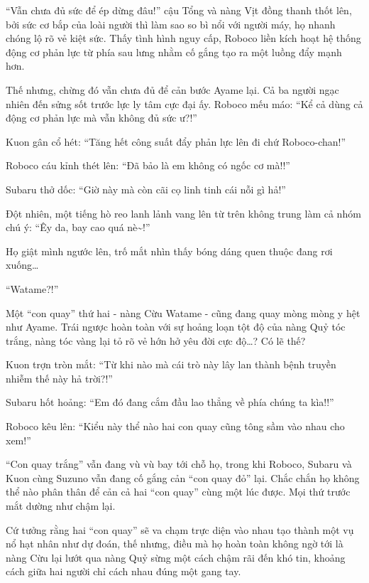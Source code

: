 \documentclass[../main.tex]{subfiles}
\begin{document}
``Vẫn chưa đủ sức để ép dừng đâu!'' cậu Tổng và nàng Vịt đồng thanh thốt lên, bởi sức cơ bắp của loài người thì làm sao so bì nổi với người máy, họ nhanh chóng lộ rõ vẻ kiệt sức. Thấy tình hình nguy cấp, Roboco liền kích hoạt hệ thống động cơ phản lực từ phía sau lưng nhằm cố gắng tạo ra một luồng đẩy mạnh hơn.

Thế nhưng, chừng đó vẫn chưa đủ để cản bước Ayame lại. Cả ba người ngạc nhiên đến sửng sốt trước lực ly tâm cực đại ấy. Roboco mếu máo: ``Kể cả dùng cả động cơ phản lực mà vẫn không đủ sức ư?!''

Kuon gân cổ hét: ``Tăng hết công suất đẩy phản lực lên đi chứ Roboco-chan!''

Roboco cáu kỉnh thét lên: ``Đã bảo là em không có ngốc cơ mà!!''

Subaru thở dốc: ``Giờ này mà còn cãi cọ linh tinh cái nỗi gì hả!''

Đột nhiên, một tiếng hò reo lanh lảnh vang lên từ trên không trung làm cả nhóm chú ý: ``Êy da, bay cao quá nè\~{}!''

Họ giật mình ngước lên, trố mắt nhìn thấy bóng dáng quen thuộc đang rơi xuống\dots

``Watame?!''

Một ``con quay'' thứ hai - nàng Cừu Watame - cũng đang quay mòng mòng y hệt như Ayame. Trái ngược hoàn toàn với sự hoảng loạn tột độ của nàng Quỷ tóc trắng, nàng tóc vàng lại tỏ rõ vẻ hớn hở yêu đời cực độ\dots? Có lẽ thế?


Kuon trợn tròn mắt: ``Từ khi nào mà cái trò này lây lan thành bệnh truyền nhiễm thế này hả trời?!''

Subaru hốt hoảng: ``Em đó đang cắm đầu lao thẳng về phía chúng ta kìa!!''

Roboco kêu lên: ``Kiểu này thể nào hai con quay cũng tông sầm vào nhau cho xem!''

``Con quay trắng'' vẫn đang vù vù bay tới chỗ họ, trong khi Roboco, Subaru và Kuon cùng Suzuno vẫn đang cố gắng cản ``con quay đỏ'' lại. Chắc chắn họ không thể nào phân thân để cản cả hai ``con quay'' cùng một lúc được. Mọi thứ trước mắt dường như chậm lại.

Cứ tưởng rằng hai ``con quay'' sẽ va chạm trực diện vào nhau tạo thành một vụ nổ hạt nhân như dự đoán, thế nhưng, điều mà họ hoàn toàn không ngờ tới là nàng Cừu lại lướt qua nàng Quỷ sừng một cách chậm rãi đến khó tin, khoảng cách giữa hai người chỉ cách nhau đúng một gang tay.

\end{document}
